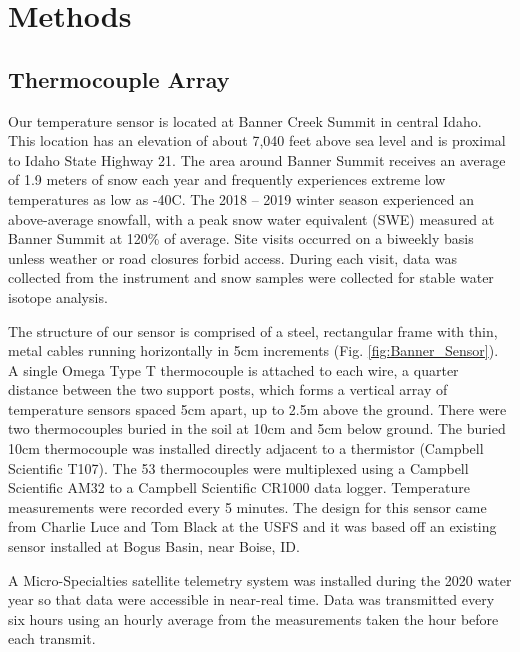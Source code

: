 \chapter{Methods}
\section{Thermocouple Array}
Our temperature sensor is located at Banner Creek Summit in central Idaho. This location has an elevation of about 7,040 feet above sea level and is proximal to Idaho State Highway 21. The area around Banner Summit receives an average of 1.9 meters of snow each year and frequently experiences extreme low temperatures as low as -40\textdegree C. The 2018 -- 2019 winter season experienced an above-average snowfall, with a peak snow water equivalent (SWE) measured at Banner Summit at 120\% of average. Site visits occurred on a biweekly basis unless weather or road closures forbid access. During each visit, data was collected from the instrument and snow samples were collected for stable water isotope analysis.

The structure of our sensor is comprised of a steel, rectangular frame with thin, metal cables running horizontally in 5cm increments (Fig. \ref{fig:Banner_Sensor}). A single Omega Type T thermocouple is attached to each wire, a quarter distance between the two support posts, which forms a vertical array of temperature sensors spaced 5cm apart, up to 2.5m above the ground. There were two thermocouples buried in the soil at 10cm and 5cm below ground. The buried 10cm thermocouple was installed directly adjacent to a thermistor (Campbell Scientific T107). The 53 thermocouples were multiplexed using a Campbell Scientific AM32 to a Campbell Scientific CR1000 data logger. Temperature measurements were recorded every 5 minutes. The design for this sensor came from Charlie Luce and Tom Black at the USFS and it was based off an existing sensor installed at Bogus Basin, near Boise, ID. 

A Micro-Specialties satellite telemetry system was installed during the 2020 water year so that data were accessible in near-real time. Data was transmitted every six hours using an hourly average from the measurements taken the hour before each transmit.

